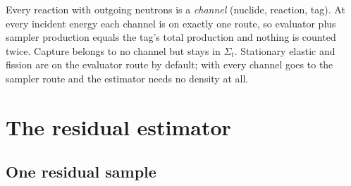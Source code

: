 \begin{keybox}
Every reaction with outgoing neutrons is a \emph{channel} (nuclide, reaction, tag). At every incident
energy each channel is on exactly one route, so evaluator plus sampler production equals the tag's
total production and nothing is counted twice. Capture belongs to no channel but stays in $\Sigma_t$.
Stationary elastic and fission are on the evaluator route by default; with  every
channel goes to the sampler route and the estimator needs no density at all.
\end{keybox}

\section{The residual estimator}\label{sec:residual}

\subsection{One residual sample}

